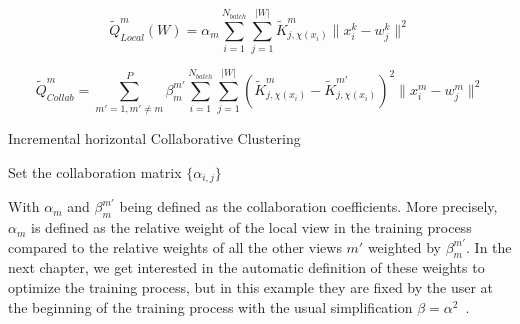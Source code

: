 		\begin{equation}
\label{criterion2}
		\widetilde{Q}_{Local}^m(W) = \alpha_m\sum_{i=1}^{N_{batch}}\sum_{j=1}^{|W|}\widetilde{K}^m_{j, \chi(x_i)}\|x_i^k - w_j^k\|^2
		\end{equation}
		
		\begin{equation}
        \widetilde{Q}_{Collab}^m = \sum_{m'=1, m'\neq m}^{P}\beta_m^{m'}\sum_{i=1}^{N_{batch}}\sum_{j=1}^{|W|}{(\widetilde{K}^m_{j, \chi(x_i)} - \widetilde{K}^{m'}_{j, \chi(x_i)})}^2  \|x_i^m - w_j^m\|^2
		\end{equation}
		
		\begin{algorithm}[H]
			\caption{Incremental horizontal Collaborative Clustering}
\label{alg1}
				Set the collaboration matrix $\{\alpha_{i,j}\}$\\
		\end{algorithm}
		
        With $\alpha_m$ and $\beta_m^{m'}$ being defined as the collaboration coefficients. More precisely, $\alpha_m$ is defined as the relative weight of the local view in the training process compared to the relative weights of all the other views $m'$ weighted by $\beta_m^{m'}$. In the next chapter, we get interested in the automatic definition of these weights to optimize the training process, but in this example they are fixed by the user at the beginning of the training process with the usual simplification $\beta = \alpha^2$~\cite{ghassany2012collaborative,rastin2015collaborative}.
	
